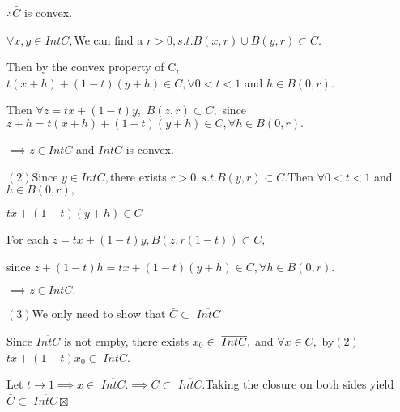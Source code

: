 \documentclass{article}
\begin{document}
$\therefore \bar{C}$ is convex.

$\forall x,y\in IntC,$We can find a $r>0,s.t.B\left( x,r\right) \cup B\left(
y,r\right) \subset C.$

Then by the convex property of C, $t\left( x+h\right) +\left( 1-t\right)
\left( y+h\right) \in C,\forall 0<t<1$ and $h\in B\left( 0,r\right) .$

Then $\forall z=tx+\left( 1-t\right) y,$ $B\left( z,r\right) \subset C,$%
since $z+h=t\left( x+h\right) +\left( 1-t\right) \left( y+h\right) \in
C,\forall h\in B\left( 0,r\right) .$

$\implies z\in IntC$ and $IntC$ is convex.

$\left( 2\right) $Since $y\in IntC,$there exists $r>0,s.t.B\left( y,r\right)
\subset C.$Then $\forall 0<t<1$ and $h\in B\left( 0,r\right) ,$

$tx+\left( 1-t\right) \left( y+h\right) \in C$

For each $z=tx+\left( 1-t\right) y,B\left( z,r\left( 1-t\right) \right)
\subset C,$

since $z+\left( 1-t\right) h=tx+\left( 1-t\right) \left( y+h\right) \in
C,\forall h\in B\left( 0,r\right) .$

$\implies z\in IntC.$

$\left( 3\right) $We only need to show that $\bar{C}\subset $ $\overline{IntC%
}$

Since  $\overline{IntC}$ is not empty, there exists $x_{0}\in $ $\overline{%
IntC},$ and $\forall x\in C,$ by$\left( 2\right) $ $tx+\left( 1-t\right)
x_{0}\in $ $IntC.$

Let $t\rightarrow 1\implies x\in $ $\overline{IntC}.\implies C\subset $ $%
\overline{IntC}.$Taking the closure on both sides yield $\bar{C}\subset $ $%
\overline{IntC}\boxtimes $ 
\end{document}
